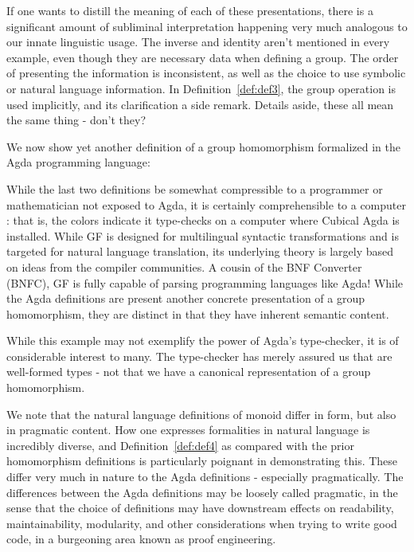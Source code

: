 If one wants to distill the meaning of each of these presentations, there is a
significant amount of subliminal interpretation happening very much analogous to
our innate linguistic usage. The inverse and identity aren't mentioned in every
example, even though they are necessary data when defining a group. The order of
presenting the information is inconsistent, as well as the choice to use
symbolic or natural language information. In Definition~\ref{def:def3}, the
group operation is used implicitly, and its clarification a side remark. Details
aside, these all mean the same thing - don't they?

We now show yet another definition of a group homomorphism formalized in the
Agda programming language:



While the last two definitions be somewhat compressible to a programmer or
mathematician not exposed to Agda, it is certainly comprehensible to a computer
: that is, the colors indicate it type-checks on a computer where Cubical Agda
is installed. While GF is designed for multilingual syntactic transformations
and is targeted for natural language translation, its underlying theory is
largely based on ideas from the compiler communities. A cousin of the BNF
Converter (BNFC), GF is fully capable of parsing programming languages like
Agda! While the Agda definitions are present another concrete presentation of a
group homomorphism, they are distinct in that they have inherent semantic
content.

While this example may not exemplify the power of Agda's type-checker, it is of
considerable interest to many. The type-checker has merely assured us that
 are well-formed types - not that we have a canonical
representation of a group homomorphism. %

We note that the natural language definitions of monoid differ in form, but also
in pragmatic content. How one expresses formalities in natural language is
incredibly diverse, and Definition~\ref{def:def4} as compared with the prior
homomorphism definitions is particularly poignant in demonstrating this. These
differ very much in nature to the Agda definitions - especially pragmatically.
The differences between the Agda definitions may be loosely called
pragmatic, in the sense that the choice of definitions may have downstream
effects on readability, maintainability, modularity, and other considerations
when trying to write good code, in a burgeoning area known as proof engineering.

